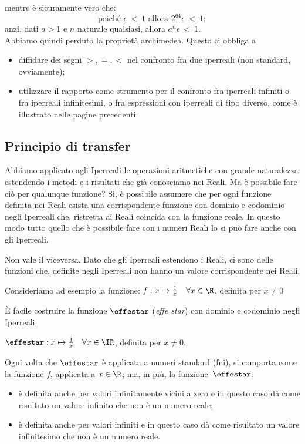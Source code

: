 mentre è sicuramente vero che:
\[
 \text{poiché }\epsilon \  < \ 1 \text{  allora  } 2^{64}\epsilon\ <\ 1;
\]
anzi, dati $a>1$ e $n$ naturale qualsiasi, allora \(a^{n}\epsilon\ <\ 1\).\\

Abbiamo quindi perduto la proprietà archimedea. Questo ci obbliga a 
\begin{itemize} [noitemsep]
 \item 
diffidare dei segni \(>,=,<\) nel confronto fra due iperreali (non standard, ovviamente);
 \item 
utilizzare il rapporto come strumento per il confronto fra iperreali infiniti o fra
iperreali infinitesimi, o fra espressioni con iperreali di tipo diverso, come è
illustrato nelle pagine precedenti. 
\end{itemize}

\subsection{Principio di transfer}
\label{subsec:insnum_nonarchimedei}

Abbiamo applicato agli Iperreali le operazioni aritmetiche con grande 
naturalezza estendendo i metodi e i risultati che già conosciamo nei Reali. 
Ma è possibile fare ciò per qualunque funzione? 
Sì, è possibile assumere che per ogni funzione definita nei Reali esista una 
corrispondente funzione con dominio e codominio negli Iperreali che, ristretta 
ai Reali coincida con la funzione reale.
In questo modo tutto quello che è possibile fare con i numeri Reali lo si può 
fare anche con gli Iperreali.

\begin{osservazione}
 Non vale il viceversa. Dato che gli Iperreali estendono i Reali, ci sono delle 
funzioni che, definite negli Iperreali non hanno un valore corrispondente nei 
Reali.

\begin{esempio}
 Consideriamo ad esempio la funzione: 
$f: x \mapsto \frac{1}{x} \quad \forall x \in \R$, definita per $x\ne 0$

È facile costruire la funzione $\effestar$ (\emph{effe star}) con dominio e codominio 
negli Iperreali:

$\effestar: x \mapsto \frac{1}{x} \quad \forall x \in \IR$, definita per $x\ne 0$.

Ogni volta che $\effestar$ è applicata a numeri standard (fni), si comporta come
la funzione $f$, applicata a $x \in \R$; ma, in più, la funzione~$\effestar$:
\begin{itemize} [noitemsep]
 \item 
è definita anche per valori infinitamente vicini a zero e 
in questo caso dà come risultato un valore infinito che non è un numero reale;
 \item 
è definita anche per valori infiniti e
in questo caso dà come risultato un valore infinitesimo che non è un numero 
reale. 
\end{itemize}
\end{esempio}
\end{osservazione}

